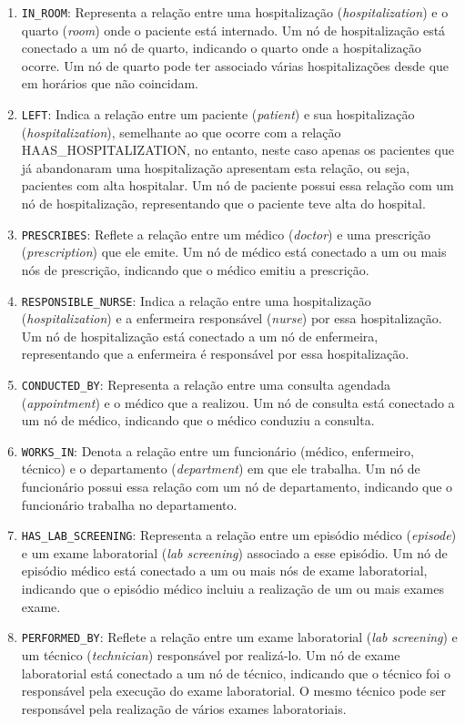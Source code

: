 \begin{enumerate}
    \item  \texttt{IN\_ROOM}: Representa a relação entre uma hospitalização (\textit{hospitalization}) e o quarto (\textit{room}) onde o paciente está internado. Um nó de hospitalização está conectado a um nó de quarto, indicando o quarto onde a hospitalização ocorre. Um nó de quarto pode ter associado várias hospitalizações desde que em horários que não coincidam.
    \item  \texttt{LEFT}: Indica a relação entre um paciente (\textit{patient}) e sua hospitalização (\textit{hospitalization}), semelhante ao que ocorre com a relação HAAS\_HOSPITALIZATION, no entanto, neste caso apenas os pacientes que já abandonaram uma hospitalização apresentam esta relação, ou seja, pacientes com alta hospitalar. Um nó de paciente possui essa relação com um nó de hospitalização, representando que o paciente teve alta do hospital.
    \item  \texttt{PRESCRIBES}: Reflete a relação entre um médico (\textit{doctor}) e uma prescrição (\textit{prescription}) que ele emite. Um nó de médico está conectado a um ou mais nós de prescrição, indicando que o médico emitiu a prescrição.
    \item  \texttt{RESPONSIBLE\_NURSE}: Indica a relação entre uma hospitalização (\textit{hospitalization}) e a enfermeira responsável (\textit{nurse}) por essa hospitalização. Um nó de hospitalização está conectado a um nó de enfermeira, representando que a enfermeira é responsável por essa hospitalização.
    \item  \texttt{CONDUCTED\_BY}: Representa a relação entre uma consulta agendada (\textit{appointment}) e o médico que a realizou. Um nó de consulta está conectado a um nó de médico, indicando que o médico conduziu a consulta.
    \item  \texttt{WORKS\_IN}: Denota a relação entre um funcionário (médico, enfermeiro, técnico) e o departamento (\textit{department}) em que ele trabalha. Um nó de funcionário possui essa relação com um nó de departamento, indicando que o funcionário trabalha no departamento.
    \item  \texttt{HAS\_LAB\_SCREENING}: Representa a relação entre um episódio médico (\textit{episode}) e um exame laboratorial (\textit{lab screening}) associado a esse episódio. Um nó de episódio médico está conectado a um ou mais nós de exame laboratorial, indicando que o episódio médico incluiu a realização de um ou mais exames exame.
    \item  \texttt{PERFORMED\_BY}: Reflete a relação entre um exame laboratorial (\textit{lab screening}) e um técnico (\textit{technician}) responsável por realizá-lo. Um nó de exame laboratorial está conectado a um nó de técnico, indicando que o técnico foi o responsável pela execução do exame laboratorial. O mesmo técnico pode ser responsável pela realização de vários exames laboratoriais.
\end{enumerate}

